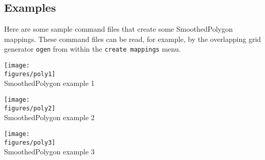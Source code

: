 \subsection{Examples}

Here are some sample command files that create some SmoothedPolygon mappings.
These command files can be read, for example, by the overlapping grid
generator {\tt ogen} from within the {\tt create mappings} menu.

\noindent
\begin{minipage}{.4\linewidth}
{\footnotesize
{}
}
\end{minipage}\hfill
\begin{minipage}{.6\linewidth}
  \begin{center}
   \texttt{[image: \\figures/poly1]} \\
  {SmoothedPolygon example 1}  \label{fig:poly1}
  \end{center}
\end{minipage}

\noindent
\begin{minipage}{.4\linewidth}
{\footnotesize
{}
}
\end{minipage}\hfill
\begin{minipage}{.6\linewidth}
  \begin{center}
   \texttt{[image: \\figures/poly2]} \\
  {SmoothedPolygon example 2}  \label{fig:poly2}
  \end{center}
\end{minipage}

\noindent
\begin{minipage}{.4\linewidth}
{\footnotesize
{}
}
\end{minipage}\hfill
\begin{minipage}{.6\linewidth}
  \begin{center}
   \texttt{[image: \\figures/poly3]} \\
  {SmoothedPolygon example 3}  \label{fig:poly3}
  \end{center}
\end{minipage}




